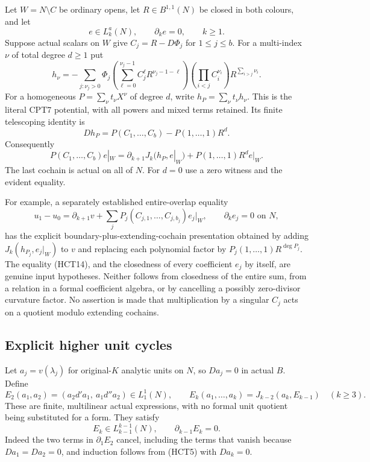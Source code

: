 Let $W=N\setminus C$ be ordinary opens, let $R\in B^{1,1}(N)$
be closed in both colours, and let
\[
 e\in L_k^a(N),\qquad \partial_k e=0,\qquad k\ge1.
 \tag{HCT10}
\]
Suppose actual scalars on $W$ give $C_j=R-D\Phi_j$ for
$1\le j\le b$.  For a multi-index $\nu$ of total degree $d\ge1$
put
\[
 h_\nu=-\sum_{j:\nu_j>0}\Phi_j
 \left(\sum_{\ell=0}^{\nu_j-1}C_j^\ell R^{\nu_j-1-\ell}\right)
 \left(\prod_{i<j}C_i^{\nu_i}\right)R^{\sum_{i>j}\nu_i}.
 \tag{HCT11}
\]
For a homogeneous $P=\sum_\nu t_\nu X^\nu$ of degree $d$,
write $h_P=\sum_\nu t_\nu h_\nu$.  This is the literal CPT7
potential, with all powers and mixed terms retained.  Its finite
telescoping identity is
\[
                 Dh_P=P(C_1,\ldots,C_b)-P(1,\ldots,1)R^d.
 \tag{HCT12}
\]
Consequently
\[
 P(C_1,\ldots,C_b)e|_W
   =\partial_{k+1}J_k(h_P,e|_W)+P(1,\ldots,1)R^d e|_W.
 \tag{HCT13}
\]
The last cochain is actual on all of $N$.  For $d=0$ use a zero
witness and the evident equality.

For example, a separately established entire-overlap equality
\[
 u_1-u_0=\partial_{k+1}v+
                 \sum_j P_j(C_{j,1},\ldots,C_{j,b_j})e_j|_W,
                 \qquad \partial_k e_j=0\text{ on }N,
 \tag{HCT14}
\]
has the explicit boundary-plus-extending-cochain presentation obtained
by adding $J_k(h_{P_j},e_j|_W)$ to $v$ and replacing each polynomial
factor by $P_j(1,\ldots,1)R^{\deg P_j}$.  The equality (HCT14),
and the closedness of every coefficient $e_j$ by itself, are genuine
input hypotheses.  Neither follows from closedness of the entire
sum, from a relation in a formal coefficient algebra, or by cancelling
a possibly zero-divisor curvature factor.  No assertion is made that
multiplication by a singular $C_j$ acts on a quotient modulo extending
cochains.

\subsection{Explicit higher unit cycles}

Let $a_j=v(\lambda_j)$ for original-$K$ analytic units on $N$,
so $Da_j=0$ in actual $B$.  Define
\[
 E_2(a_1,a_2)=(a_2d'a_1,\ a_1d''a_2)\in L_1^1(N),
 \qquad
 E_k(a_1,\ldots,a_k)=J_{k-2}(a_k,E_{k-1})\quad(k\ge3).
 \tag{HCT15}
\]
These are finite, multilinear actual expressions, with no formal
unit quotient being substituted for a form.  They satisfy
\[
 E_k\in L_{k-1}^{k-1}(N),\qquad \partial_{k-1}E_k=0.
 \tag{HCT16}
\]
Indeed the two terms in $\partial_1E_2$ cancel, including the terms
that vanish because $Da_1=Da_2=0$, and induction follows from
(HCT5) with $Da_k=0$.


